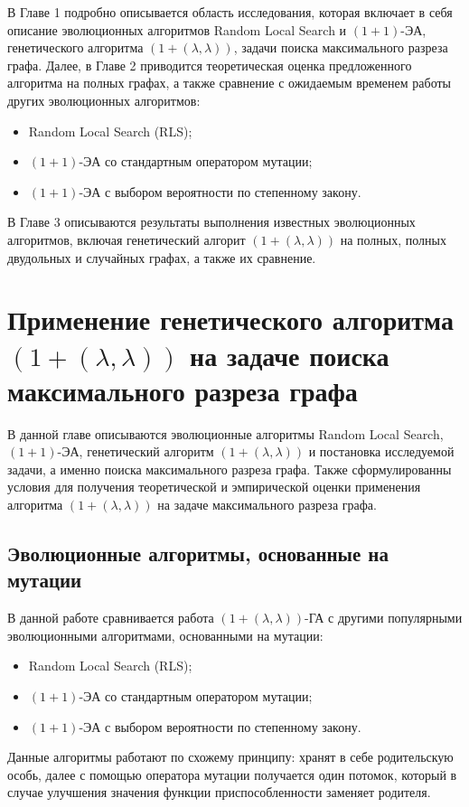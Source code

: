 \documentclass[times]{itmo-student-thesis}
\newcommand{\alglambda}{${(1 + (\lambda , \lambda))}$\xspace}
\newcommand{\alglambdaf}{${(1 + (\lambda , \lambda))}$-ГА\xspace}
\newcommand{\oea}{\mbox{$(1 + 1)$-ЭА}\xspace}
\begin{document}
В Главе 1 подробно описывается область исследования, которая включает в себя описание эволюционных алгоритмов Random Local Search и \oea, генетического алгоритма \alglambda, задачи поиска максимального разреза графа.
Далее, в Главе 2 приводится теоретическая оценка предложенного алгоритма на полных графах, а также сравнение с ожидаемым временем работы других эволюционных алгоритмов:
\begin{itemize}
  \item Random Local Search (RLS);
  \item \oea со стандартным оператором мутации;
  \item \oea с выбором вероятности по степенному закону.
\end{itemize}

В Главе 3 описываются результаты выполнения известных эволюционных алгоритмов, включая генетический алгорит \alglambda на полных, полных двудольных и случайных графах, а также их сравнение.

\chapter{Применение генетического алгоритма \alglambda на задаче поиска максимального разреза графа}

\startrelatedwork
В данной главе описываются эволюционные алгоритмы Random Local Search, \oea, генетический алгоритм \alglambda и постановка исследуемой задачи, а именно поиска максимального разреза графа.
Также сформулированны условия для получения теоретической и эмпирической оценки применения алгоритма \alglambda на задаче максимального разреза графа.
\finishrelatedwork

\section{Эволюционные алгоритмы, основанные на мутации}
В данной работе сравнивается работа \alglambdaf с другими популярными эволюционными алгоритмами, основанными на мутации:
\begin{itemize}
  \item Random Local Search (RLS);
  \item \oea со стандартным оператором мутации;
  \item \oea с выбором вероятности по степенному закону.
\end{itemize}

Данные алгоритмы работают по схожему принципу: хранят в себе родительскую особь, далее с помощью оператора мутации получается один потомок, который в случае улучшения значения функции приспособленности заменяет родителя.
\end{document}
